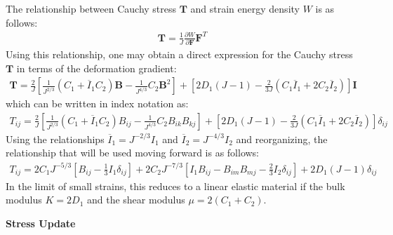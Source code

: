The relationship between Cauchy stress ${\bm T}$ and strain energy density $W$ is as follows:
\begin{align}
{\bm T} = \frac{1}{J}\frac{\partial W}{\partial {\bm F}}{\bm F}^{T}
\end{align}
Using this relationship, one may obtain a direct expression for the Cauchy stress ${\bm T}$ in terms of the deformation gradient:
\begin{align}
{\bm T} = \frac{2}{J}\left[\frac{1}{J^{2/3}}(C_1 + \overline{I}_1{C_2}){\bm B} - \frac{1}{J^{4/3}}C_2{\bm B}^2\right] + \left[2D_1(J-1) - \frac{2}{3J}(C_1\overline{I}_1 + 2C_2\overline{I}_2)\right]{\bm I}
\end{align}
which can be written in index notation as:
\begin{align}
T_{ij} = \frac{2}{J}\left[\frac{1}{J^{2/3}}(C_1 + \overline{I}_{1}C_2)B_{ij} - \frac{1}{J^{4/3}}C_2B_{ik}B_{kj}\right] + \left[2D_1(J-1) - \frac{2}{3J}(C_1\overline{I}_{1} + 2C_2\overline{I}_{2})\right]\delta_{ij}
\end{align}
Using the relationships $\overline{I}_{1} = J^{-2/3}I_1$ and $\overline{I}_{2} = J^{-4/3}I_2$ and reorganizing, the relationship that will be used moving forward is as follows:
\begin{align}
\label{eq:stress}
T_{ij} = 2C_1J^{-5/3}\left[B_{ij} - \frac{1}{3}I_1\delta_{ij}\right] + 2C_2J^{-7/3}\left[I_1B_{ij} - B_{im}B_{mj} - \frac{2}{3}I_2\delta_{ij}\right] + 2D_1(J-1)\delta_{ij}
\end{align}
In the limit of small strains, this reduces to a linear elastic material if the bulk modulus $K = 2D_1$ and the shear modulus $\mu = 2(C_1 + C_2)$.

\textbf{Stress Update}


